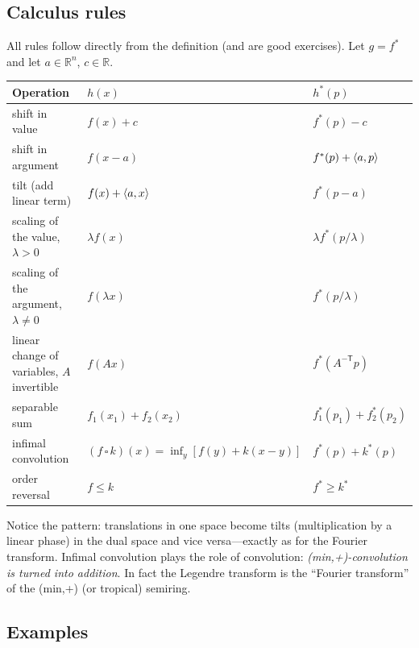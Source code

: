 \subsection{Calculus rules}

All rules follow directly from the definition (and are good exercises).
Let $g=f^*$ and let $a\in\mathbb{R}^n$, $c\in\mathbb{R}$.

\begin{center}
\begin{tabular}{@{}lll@{}}
\toprule
Operation & $h(x)$ & $h^*(p)$\\
\midrule
shift in value & $f(x)+c$ & $f^*(p)-c$\\
shift in argument & $f(x-a)$ & $f^*(p)+\langle a,p\rangle$\\
tilt (add linear term) & $f(x)+\langle a,x\rangle$ & $f^*(p-a)$\\
scaling of the value, $\lambda>0$ & $\lambda f(x)$ & $\lambda f^*(p/\lambda)$\\
scaling of the argument, $\lambda\ne0$ & $f(\lambda x)$ & $f^*(p/\lambda)$\\
linear change of variables, $A$ invertible & $f(Ax)$ & $f^*(A^{-\mathsf T}p)$\\
separable sum & $f_1(x_1)+f_2(x_2)$ & $f_1^*(p_1)+f_2^*(p_2)$\\
infimal convolution & $(f\,\square\,k)(x)=\inf_y[f(y)+k(x-y)]$ & $f^*(p)+k^*(p)$\\
order reversal & $f\le k$ & $f^*\ge k^*$\\
\bottomrule
\end{tabular}
\end{center}

Notice the pattern: translations in one space become tilts (multiplication by
a linear phase) in the dual space and vice versa---exactly as for the Fourier
transform.  Infimal convolution plays the role of convolution:
\emph{(min,+)-convolution is turned into addition}.  In fact the Legendre
transform is the ``Fourier transform'' of the (min,+) (or tropical) semiring.

\subsection{Examples}


